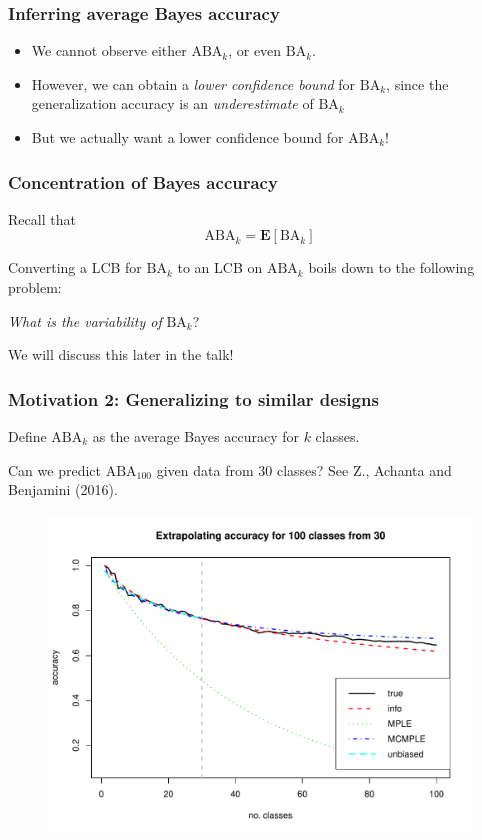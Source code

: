 \documentclass{beamer}
\begin{document}
\begin{frame}
\frametitle{Inferring average Bayes accuracy}
\begin{itemize}
\item We cannot observe either $\text{ABA}_k$, or even $\text{BA}_k$.
\item However, we can obtain a \emph{lower confidence bound} for $\text{BA}_k$, since the generalization accuracy is an \emph{underestimate} of $\text{BA}_k$
\item But we actually want a lower confidence bound for $\text{ABA}_k$!
\end{itemize}
\end{frame}

\begin{frame}
\frametitle{Concentration of Bayes accuracy}
Recall that
\[
\text{ABA}_k = \textbf{E}[\text{BA}_k]
\]

Converting a LCB for $\text{BA}_k$ to an LCB on $\text{ABA}_k$ boils down to the following problem:
\vspace{0.2in}

\emph{What is the variability of }$\text{BA}_k$?
\vspace{0.2in}

We will discuss this later in the talk!
\end{frame}


\begin{frame}
\frametitle{Motivation 2: Generalizing to similar designs}
Define $\text{ABA}_k$ as the average Bayes accuracy for $k$ classes.

Can we predict $\text{ABA}_{100}$ given data from 30 classes?  See Z., Achanta and Benjamini (2016).
\begin{figure}
\centering
\includegraphics[scale = 0.4]{../info_theory_paper/cifar_example.pdf}
\end{figure}
\end{frame}
\end{document}
